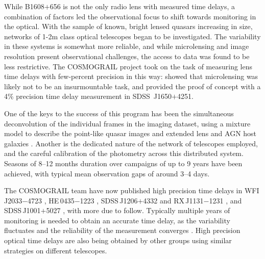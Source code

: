 While B1608$+$656 is not the only radio lens with measured time
delays, a combination of factors led the observational focus to shift
towards monitoring in the optical. With the sample of known, bright
lensed quasars increasing in size, networks of 1-2m class optical
telescopes began to be investigated. The variability in these systems
is somewhat more reliable, and while microlensing and image resolution
present observational challenges, the access to data was found to be
less restrictive. The COSMOGRAIL project \citep{Cou++05} took on the
task of measuring lens time delays with few-percent precision in this
way:
\citet{Eig++05} showed that microlensing was likely not to be an
insurmountable task, and \citet{Vui++07} provided the proof of concept
with a 4\% precision time delay measurement in SDSS\ J1650$+$4251.

One of the keys to the success of this program has been the simultaneous
deconvolution of the individual frames in the imaging dataset, using  a
mixture model to describe the point-like quasar images and extended lens
and AGN host galaxies \citep{MCS98}.  Another is the dedicated nature of
the network of telescopes employed, and the  careful calibration of the
photometry across this distributed system. Seasons of 8--12 months
duration over campaigns of up to 9 years have been achieved, with
typical mean observation gaps of around 3--4 days.

The COSMOGRAIL team have now published high precision time delays in
WFI\,J2033$-$4723 \citep[][3.8\%]{Vui++08}, HE\,0435$-$1223
\citep[][5.6\%]{Cou++11}, SDSS\,J1206$+$4332 \citep[][2.7\%]{Eul++13}
and  RX\,J1131$-$1231 \citep[][1.5\%]{Tew++13}, and SDSS\,J1001$+$5027
\citep[][2.8\%]{RK++13}, with more due to follow.  Typically multiple
years of monitoring is needed to obtain an accurate  time delay, as the
variability fluctuates and the reliability of the  measurement converges
\citep[see the discussion in e.g.\ ][]{Tew++13}. High precision optical time delays are also being obtained by other groups \citep{Poi++07a,Foh++07,Dah++15} using similar strategies on different telescopes.

